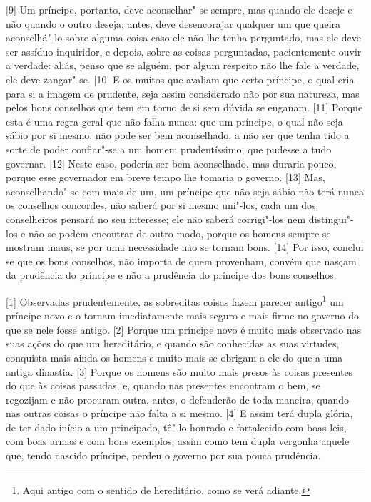 {[}9{]} Um príncipe, portanto, deve aconselhar"-se sempre, mas quando ele
deseje e não quando o outro deseja; antes, deve desencorajar qualquer um
que queira aconselhá"-lo sobre alguma coisa caso ele não lhe tenha
perguntado, mas ele deve ser assíduo inquiridor, e depois, sobre as
coisas perguntadas, pacientemente ouvir a verdade: aliás, penso que se
alguém, por algum respeito não lhe fale a verdade, ele deve zangar"-se.
{[}10{]} E os muitos que avaliam que certo príncipe, o qual cria para si
a imagem de prudente, seja assim considerado não por sua natureza, mas
pelos bons conselhos que tem em torno de si sem dúvida se enganam.
{[}11{]} Porque esta é uma regra geral que não falha nunca: que um
príncipe, o qual não seja sábio por si mesmo, não pode ser bem
aconselhado, a não ser que tenha tido a sorte de poder confiar"-se a um
homem prudentíssimo, que pudesse a tudo governar. {[}12{]} Neste caso,
poderia ser bem aconselhado, mas duraria pouco, porque esse governador
em breve tempo lhe tomaria o governo. {[}13{]} Mas, aconselhando"-se com
mais de um, um príncipe que não seja sábio não terá nunca os conselhos
concordes, não saberá por si mesmo uni"-los, cada um dos conselheiros
pensará no seu interesse; ele não saberá corrigi"-los nem distingui"-los e
não se podem encontrar de outro modo, porque os homens sempre se mostram
maus, se por uma necessidade não se tornam bons. {[}14{]} Por isso,
conclui se que os bons conselhos, não importa de quem provenham, convém
que nasçam da prudência do príncipe e não a prudência do príncipe dos
bons conselhos.


{[}1{]} Observadas prudentemente, as sobreditas coisas fazem parecer
antigo\footnote{Aqui antigo com o sentido de hereditário, como se verá
  adiante.} um príncipe novo e o tornam imediatamente mais seguro e mais
firme no governo do que se nele fosse antigo. {[}2{]} Porque um príncipe
novo é muito mais observado nas suas ações do que um hereditário, e
quando são conhecidas as suas virtudes, conquista mais ainda os homens e
muito mais se obrigam a ele do que a uma antiga dinastia. {[}3{]} Porque
os homens são muito mais presos às coisas presentes do que às coisas
passadas, e, quando nas presentes encontram o bem, se regozijam e não
procuram outra, antes, o defenderão de toda maneira, quando nas outras
coisas o príncipe não falta a si mesmo. {[}4{]} E assim terá dupla
glória, de ter dado início a um principado, tê"-lo honrado e fortalecido
com boas leis, com boas armas e com bons exemplos, assim como tem dupla
vergonha aquele que, tendo nascido príncipe, perdeu o governo por sua
pouca prudência.


